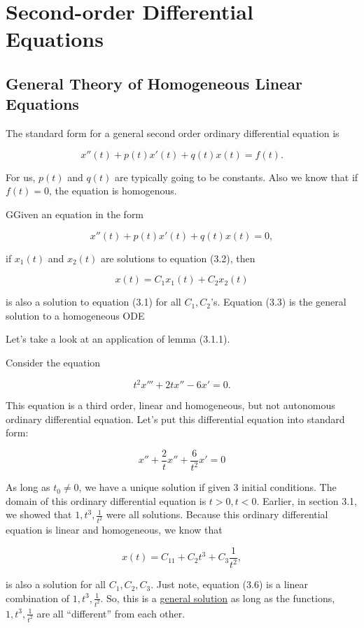 \chapter{Second-order Differential Equations}

\section{General Theory of Homogeneous Linear Equations}
  The standard form for a general second order ordinary differential equation is

  \[
    x''(t)+p(t)x'(t)+q(t)x(t)=f(t).
  \]
  
  For us, $p(t)$ and $q(t)$ are typically going to be constants. Also we know that if $f(t)=0$, the equation is homogenous.

  \begin{lemma}
    GGiven an equation in the form 

    \[
      x''(t)+p(t)x'(t)+q(t)x(t)=0,
    \]

    if $x_1(t)$ and $x_2(t)$ are solutions to equation (3.2), then 
    \[\]

    \[
      x(t)=C_1x_1(t)+C_2x_2(t)
    \]

    is also a solution to equation (3.1) for all $C_1,C_2$'s. Equation (3.3) is the general solution to a homogeneous ODE
  \end{lemma}

  Let's take a look at an application of lemma (3.1.1).

  \begin{problem}
    Consider the equation

    \[
    t^2x'''+2tx''-6x'=0.
    \]

    This equation is a third order, linear and homogeneous, but not autonomous ordinary differential equation. Let's put this differential equation into standard form:

    \[
    x''+\frac{2}{t}x''+\frac{6}{t^2}x'=0
    \]

    As long as $t_0\neq0$, we have a unique solution if given 3 initial conditions. The domain of this ordinary differential equation is $t>0,t<0$. Earlier, in section 3.1, we showed that $1,t^3,\frac{1}{t^2}$ were all solutions. Because this ordinary differential equation is linear and homogeneous, we know that 

    \[
    x(t)=C_11+C_2t^3+C_3\frac{1}{t^2},
    \]

    is also a solution for all $C_1,C_2,C_3$. Just note, equation (3.6) is a linear combination of $1,t^3,\frac{1}{t^2}$. So, this is a \underline{general solution} as long as the functions, $1,t^3,\frac{1}{t^2}$ are all “different” from each other.
  \end{problem}

